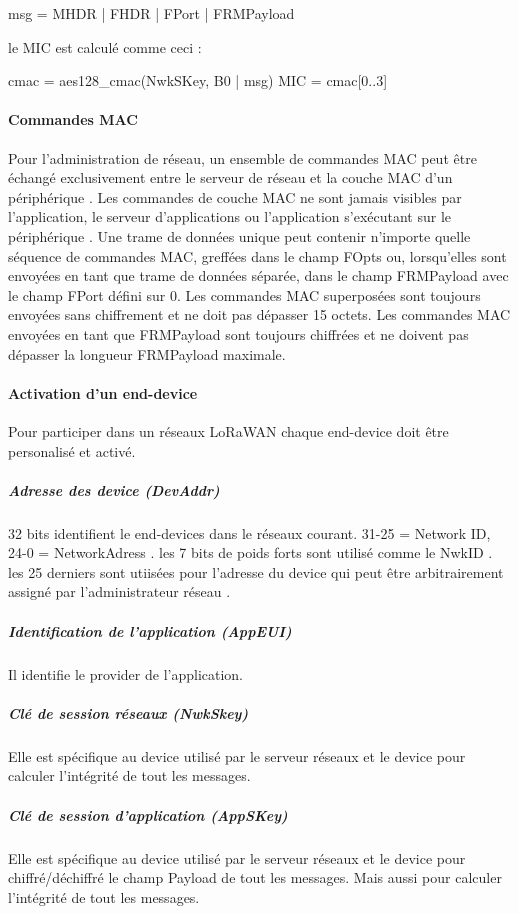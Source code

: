 \documentclass[11pt]{article}
\begin{document}
msg = MHDR | FHDR | FPort | FRMPayload

le MIC est calculé comme ceci :

cmac = aes128\_cmac(NwkSKey, B0 | msg)
MIC = cmac[0..3]
\paragraph{Commandes MAC}
Pour l'administration de réseau, un ensemble de commandes MAC peut être échangé exclusivement entre le serveur de réseau et la couche MAC d'un périphérique . Les commandes de couche MAC ne sont jamais visibles par l'application, le serveur d'applications ou l'application s'exécutant sur le périphérique .
Une trame de données unique peut contenir n'importe quelle séquence de commandes MAC, greffées dans le champ FOpts ou, lorsqu'elles sont envoyées en tant que trame de données séparée, dans le champ FRMPayload avec le champ FPort défini sur 0. Les commandes MAC superposées sont toujours envoyées sans chiffrement et ne doit pas dépasser 15 octets. Les commandes MAC envoyées en tant que FRMPayload sont toujours chiffrées et ne doivent pas dépasser la longueur FRMPayload maximale.
\paragraph{Activation d'un end-device}
Pour participer dans un réseaux LoRaWAN chaque end-device doit être personalisé et activé.

\subparagraph{Adresse des device (DevAddr)}
32 bits identifient le end-devices dans le réseaux courant.
31-25 = Network ID, 24-0 = NetworkAdress .
les 7 bits de poids forts sont utilisé comme le NwkID .
les 25 derniers sont utiisées pour l'adresse du device qui peut être arbitrairement assigné par l'administrateur réseau .
\subparagraph{Identification de l'application (AppEUI)}
Il identifie le provider de l'application.
\subparagraph{Clé de session réseaux (NwkSkey)}
Elle est spécifique au device utilisé par le serveur réseaux et le device pour calculer l'intégrité de tout les messages.
\subparagraph{Clé de session d'application (AppSKey)}
Elle est spécifique au device utilisé par le serveur réseaux et le device pour chiffré/déchiffré le champ Payload de tout les messages. Mais aussi pour calculer l'intégrité de tout les messages.
\end{document}
